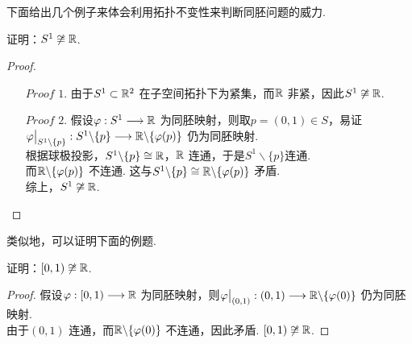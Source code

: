 	\vspace*{2em}
	下面给出几个例子来体会利用拓扑不变性来判断同胚问题的威力.
	\begin{example}
		证明：$S^1 \not\cong \mathbb{R}$.
		
		\vspace*{2em}
		\begin{proof}
			\begin{enumerate}
				\item[$Proof \,\, 1.$]由于$S^1 \subset \mathbb{R}^2$ 在子空间拓扑下为紧集，而$\mathbb{R}$ 非紧，因此$S^1 \not\cong \mathbb{R}$.
				
				\item[$Proof \,\, 2.$]假设$\varphi : S^1 \longrightarrow \mathbb{R}$ 为同胚映射，则取$p = (0 , 1) \in S$，易证\\
				$\varphi \big|_{S^{1} \backslash \{ p \}} : S^{1} \backslash \{ p \} \longrightarrow \mathbb{R} \backslash \{ \varphi(p) \}$ 仍为同胚映射.\\
				根据球极投影，$S^1 \backslash \{ p \} \cong \mathbb{R}$，$\mathbb{R}$ 连通，于是$S^1 \backslash \{ p \}$连通.\\
				而$\mathbb{R} \backslash \{ \varphi(p) \}$ 不连通. 这与$S^1 \backslash \{ p \} \cong \mathbb{R} \backslash \{ \varphi(p) \}$ 矛盾.\\
				综上，$S^1 \not\cong \mathbb{R}$.
			\end{enumerate}
		\end{proof}
	\end{example}
	
	\vspace*{2em}
	类似地，可以证明下面的例题.
	\begin{example}
		证明：$[0 , 1) \not\cong \mathbb{R}$.
		
		\vspace*{2em}
		\begin{proof}
			假设$\varphi : [0 , 1) \longrightarrow \mathbb{R}$ 为同胚映射，则$\varphi \big|_{(0 , 1)} : (0 , 1) \longrightarrow \mathbb{R} \backslash \{ \varphi(0) \}$ 仍为同胚映射.\\
			由于$(0 , 1)$ 连通，而$\mathbb{R} \backslash \{ \varphi(0) \}$ 不连通，因此矛盾. $[0 , 1) \not\cong \mathbb{R}$.
		\end{proof}
	\end{example}

